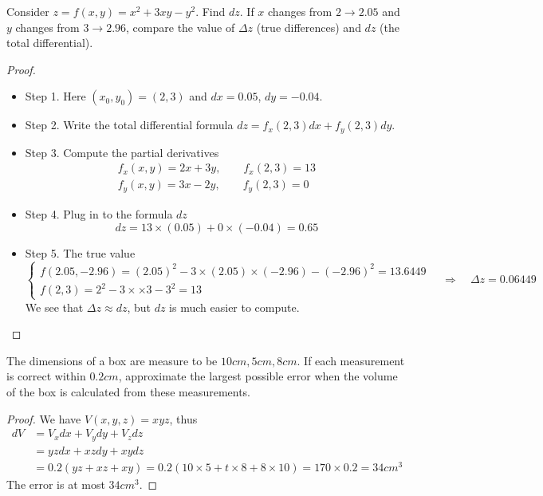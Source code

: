 \begin{example} Consider $z = f(x,y) = x^2+3xy-y^2$. Find $dz$. If $x$ changes from $2\to 2.05$ and $y$ changes from $3\to 2.96$, compare the value of $\Delta z$ (true differences) and $dz$ (the total differential).
\end{example}
\begin{proof}\quad 
    \begin{itemize}
        \item Step 1. Here $(x_0,y_0) = (2,3)$ and $dx = 0.05$, $dy = -0.04$.
        \item Step 2. Write the total differential formula $dz = f_x(2,3)dx + f_y(2,3)dy$.
        \item Step 3. Compute the partial derivatives
        \begin{align*}
            f_x(x,y) = 2x+3y, \qquad f_x(2,3) = 13\\
            f_y(x,y) =3x-2y, \qquad f_y(2,3) = 0
    \end{align*}
        \item Step 4. Plug in to the formula $dz$
        \begin{equation*}
            dz = 13 \times (0.05) + 0 \times (-0.04) = 0.65
        \end{equation*}
        \item Step 5. The true value 
        \begin{equation*}
        \begin{cases}
            f(2.05, -2.96) = (2.05)^2 - 3\times (2.05)\times (-2.96) - (-2.96)^2 = 13.6449\\
            f(2,3) = 2^2 - 3\times \times 3 - 3^2 = 13
        \end{cases} \quad \Longrightarrow\quad \Delta z = 0.06449
        \end{equation*}
        We see that $\Delta z \approx dz$, but $dz$ is much easier to compute.
    \end{itemize}
\end{proof}

\clearpage

\begin{example} The dimensions of a box are measure to be $10 cm, 5cm, 8cm$. If each measurement is correct within $0.2cm$, approximate the largest possible error when the volume of the box is calculated from these measurements.
\end{example}
\begin{proof} We have $V(x,y,z) = xyz$, thus
\begin{equation*}
\begin{aligned}
    dV &= V_xdx + V_ydy + V_zdz \\
        &= yz dx + xz dy + xy dz \\
        &= 0.2(yz + xz + xy) = 0.2 (10\times 5 + t\times 8 + 8\times 10) = 170\times 0.2 =34 cm^3
\end{aligned}
\end{equation*}
The error is at most $34cm^3$. 
\end{proof}